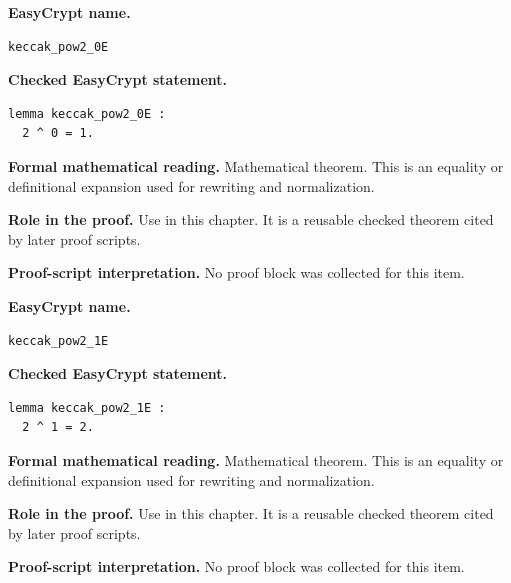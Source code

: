 \begin{formaltheorem}
\noindent\textbf{EasyCrypt name.}
\begin{lstlisting}[language=EasyCrypt,basicstyle=\ttfamily\scriptsize]
keccak_pow2_0E
\end{lstlisting}
\noindent\textbf{Checked EasyCrypt statement.}
\begin{lstlisting}[language=EasyCrypt,basicstyle=\ttfamily\scriptsize]
lemma keccak_pow2_0E :
  2 ^ 0 = 1.
\end{lstlisting}
\noindent\textbf{Formal mathematical reading.}
Mathematical theorem. This is an equality or definitional expansion used for rewriting and normalization.

\noindent\textbf{Role in the proof.}
Use in this chapter. It is a reusable checked theorem cited by later proof scripts.

\noindent\textbf{Proof-script interpretation.}
No proof block was collected for this item.

\end{formaltheorem}

\begin{formaltheorem}
\noindent\textbf{EasyCrypt name.}
\begin{lstlisting}[language=EasyCrypt,basicstyle=\ttfamily\scriptsize]
keccak_pow2_1E
\end{lstlisting}
\noindent\textbf{Checked EasyCrypt statement.}
\begin{lstlisting}[language=EasyCrypt,basicstyle=\ttfamily\scriptsize]
lemma keccak_pow2_1E :
  2 ^ 1 = 2.
\end{lstlisting}
\noindent\textbf{Formal mathematical reading.}
Mathematical theorem. This is an equality or definitional expansion used for rewriting and normalization.

\noindent\textbf{Role in the proof.}
Use in this chapter. It is a reusable checked theorem cited by later proof scripts.

\noindent\textbf{Proof-script interpretation.}
No proof block was collected for this item.

\end{formaltheorem}

